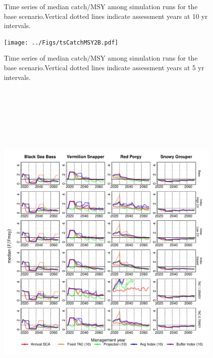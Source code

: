 \documentclass[12pt,english]{article}
\begin{document}
\begin{appendix}
\begin{figure}[!ht]
\begin{flushleft}
\caption{Time series of median $\mathrm{catch/MSY}$ among simulation runs for the base scenario.Vertical dotted lines indicate assessment years at 10 yr intervals.}
\label{fig:tsCatchMSY2}
\end{flushleft}
\end{figure}
\clearpage\begin{figure}[!ht]
\begin{center}
\texttt{[image: ../Figs/tsCatchMSY2B.pdf]}
\end{center}
\begin{flushleft}
\caption{Time series of median $\mathrm{catch/MSY}$ among simulation runs for the base scenario.Vertical dotted lines indicate assessment years at 5 yr intervals.}
\label{fig:tsCatchMSY2B}
\end{flushleft}
\end{figure}
\clearpage\begin{figure}[!ht]
\begin{center}
\includegraphics[width=6in, height=7in]{../Figs/tsFFmsy2.pdf}

\end{center}
\end{figure}
\end{appendix}
\end{document}
